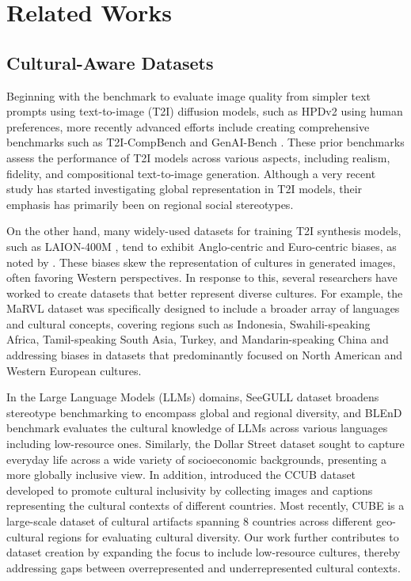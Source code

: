 \section{Related Works}
\subsection{Cultural-Aware Datasets}
Beginning with the benchmark to evaluate image quality from simpler text prompts using text-to-image (T2I) diffusion models, such as HPDv2  \cite{wu2023human} using human preferences, more recently advanced efforts include creating comprehensive benchmarks such as T2I-CompBench  \cite{huang2023t2i} and GenAI-Bench  \cite{li2024genai}. These prior benchmarks assess the performance of T2I models across various aspects, including realism, fidelity, and compositional text-to-image generation. Although a very recent study \cite{jha2024visage} has started investigating global representation in T2I models, their emphasis has primarily been on regional social stereotypes.

On the other hand, many widely-used datasets for training T2I synthesis models, such as LAION-400M  \cite{schuhmann2021laion}, tend to exhibit Anglo-centric and Euro-centric biases, as noted by  \citet{birhane2021multimodal}. These biases skew the representation of cultures in generated images, often favoring Western perspectives. In response to this, several researchers have worked to create datasets that better represent diverse cultures. For example, the MaRVL dataset  \cite{liu2021visually} was specifically designed to include a broader array of languages and cultural concepts, covering regions such as Indonesia, Swahili-speaking Africa, Tamil-speaking South Asia, Turkey, and Mandarin-speaking China and addressing biases in datasets that predominantly focused on North American and Western European cultures. 

In the Large Language Models (LLMs) domains, SeeGULL dataset  \cite{jha-etal-2023-seegull} broadens stereotype benchmarking to encompass global and regional diversity, and BLEnD benchmark  \cite{myung2024blend} evaluates the cultural knowledge of LLMs across various languages including low-resource ones.
Similarly, the Dollar Street dataset \cite{gaviria2022dollar} sought to capture everyday life across a wide variety of socioeconomic backgrounds, presenting a more globally inclusive view. In addition, \citet{liu2023towards} introduced the CCUB dataset developed to promote cultural inclusivity by collecting images and captions representing the cultural contexts of different countries. Most recently, CUBE \cite{kannenbeyond} is a large-scale dataset of cultural artifacts spanning 8 countries across different geo-cultural regions for evaluating cultural diversity. Our work further contributes to dataset creation by expanding the focus to include low-resource cultures, thereby addressing gaps between overrepresented and underrepresented cultural contexts.

